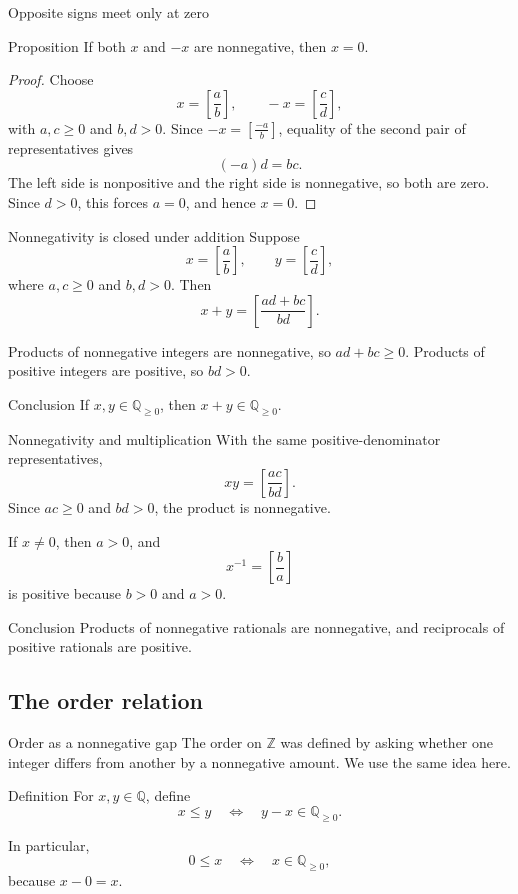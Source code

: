 \documentclass[aspectratio=169,11pt]{beamer}
\newcommand{\Z}{\mathbb Z}
\newcommand{\Q}{\mathbb Q}
\newcommand{\qcl}[2]{\left[\frac{#1}{#2}\right]}
\begin{document}
\begin{frame}{Opposite signs meet only at zero}
  \small
  \begin{block}{Proposition}
    If both \(x\) and \(-x\) are nonnegative, then \(x=0\).
  \end{block}

  \begin{proof}
    Choose
    \[
      x=\qcl ab,
      \qquad
      -x=\qcl cd,
    \]
    with \(a,c\ge0\) and \(b,d>0\).  Since
    \(-x=\qcl{-a}b\), equality of the second pair of representatives gives
    \[
      (-a)d=bc.
    \]
    The left side is nonpositive and the right side is nonnegative, so both
    are zero.  Since \(d>0\), this forces \(a=0\), and hence \(x=0\).
  \end{proof}
\end{frame}

\begin{frame}{Nonnegativity is closed under addition}
  Suppose
  \[
    x=\qcl ab,
    \qquad
    y=\qcl cd,
  \]
  where \(a,c\ge0\) and \(b,d>0\).  Then
  \[
    x+y=\qcl{ad+bc}{bd}.
  \]

  Products of nonnegative integers are nonnegative, so
  \(ad+bc\ge0\).  Products of positive integers are positive, so \(bd>0\).

  \begin{block}{Conclusion}
    If \(x,y\in\Q_{\ge0}\), then \(x+y\in\Q_{\ge0}\).
  \end{block}
\end{frame}

\begin{frame}{Nonnegativity and multiplication}
  With the same positive-denominator representatives,
  \[
    xy=\qcl{ac}{bd}.
  \]
  Since \(ac\ge0\) and \(bd>0\), the product is nonnegative.

  If \(x\ne0\), then \(a>0\), and
  \[
    x^{-1}=\qcl ba
  \]
  is positive because \(b>0\) and \(a>0\).

  \begin{block}{Conclusion}
    Products of nonnegative rationals are nonnegative, and reciprocals of
    positive rationals are positive.
  \end{block}
\end{frame}

\subsection{The order relation}

\begin{frame}{Order as a nonnegative gap}
  The order on \(\Z\) was defined by asking whether one integer differs from
  another by a nonnegative amount.  We use the same idea here.

  \begin{block}{Definition}
    For \(x,y\in\Q\), define
    \[
      \boxed{x\le y
        \quad\Longleftrightarrow\quad
        y-x\in\Q_{\ge0}.}
    \]
  \end{block}

  In particular,
  \[
    0\le x
    \quad\Longleftrightarrow\quad
    x\in\Q_{\ge0},
  \]
  because \(x-0=x\).
\end{frame}
\end{document}
